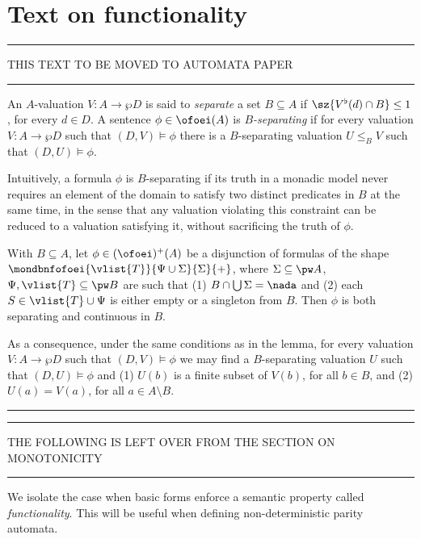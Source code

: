 \section{Text on functionality}

\bigskip\hrule\bigskip
THIS TEXT TO BE MOVED TO AUTOMATA PAPER
\bigskip\hrule\bigskip

\begin{definition}
An $A$-valuation $V: A \to \wp D$ is said to \emph{separate} a set $B
\subseteq 
A$ if $\sz{V^{\flat}(d) \cap B} \leq 1$, for every $d \in D$.
%
A sentence $\phi \in \ofoei(A)$ is \emph{$B$-separating}
if for every valuation $V: A \to \wp D$ such that $(D,V) \models 
\phi$ there is a $B$-separating valuation $U \leq_{B} V$ such that
$(D,U) 
\models \phi$.
\end{definition}

Intuitively, a formula $\phi$ is $B$-separating if its truth in a
monadic model 
never requires an element of the domain to satisfy two distinct
predicates in 
$B$ at the same time, in the sense that any valuation violating this
constraint
can be reduced to a valuation satisfying it, without sacrificing the
truth of
$\phi$.

\begin{lemma}
With $B \subseteq A$, let $\phi \in (\ofoei)^{+}(A)$ be a disjunction 
of formulas of the shape
$\mondbnfofoei{\vlist{T}}{\Psi \cup \Sigma}{\Sigma}{+}$, where
$\Sigma\subseteq \pw A$, $\Psi, \vlist{T} \subseteq \pw B$ are such
that
(1) $B \cap \bigcup\Sigma = \nada$ and 
(2) each $S \in \vlist{T} \cup \Psi$ is either empty or a singleton
from $B$. 
Then $\phi$ is both separating and continuous in $B$.
\end{lemma}

As a consequence, under the same conditions as in the lemma, for
every valuation
$V: A \to \wp D$ such that $(D,V) \models \phi$ we may find a
$B$-separating 
valuation $U$ such that $(D,U) \models \phi$ and
(1) $U(b)$ is a finite subset of $V(b)$, for all $b \in B$, and
(2) $U(a) = V(a)$, for all $a \in A \setminus B$.

\bigskip\hrule\bigskip

\newpage


\bigskip\hrule\bigskip

THE FOLLOWING IS LEFT OVER FROM THE SECTION ON MONOTONICITY

\bigskip\hrule\bigskip

We isolate the case when basic forms enforce a semantic property
called 
\emph{functionality}. 
This will be useful when defining non-deterministic parity automata.

